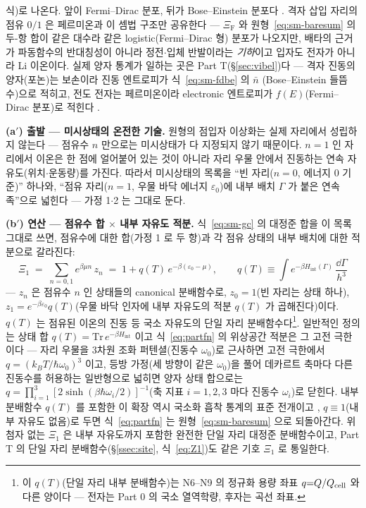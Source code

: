 \begin{bgbox}
식)로 나온다. 앞이 Fermi--Dirac 분포, 뒤가 Bose--Einstein 분포다 \cite{mcquarrie1976}. 격자 삽입 자리의
점유 $0/1$ 은 페르미온과 이 셈법 구조만 공유한다 --- $\Xi_\mathrm F$ 와 원형~\eqref{eq:sm-baresum} 의 두-항
합이 같은 대수라 같은 logistic(Fermi--Dirac 형) 분포가 나오지만, 배타의 근거가 파동함수의 반대칭성이 아니라
정전$\cdot$입체 반발이라는 \emph{기하}이고 입자도 전자가 아니라 Li 이온이다. 실제 양자 통계가 일하는 곳은
Part T(\S\ref{sec:vibel})다 --- 격자 진동의 양자(포논)는 보손이라 진동 엔트로피가 식~\eqref{eq:sm-fdbe} 의 $\bar n$
(Bose--Einstein 들뜸수)으로 적히고, 전도 전자는 페르미온이라 electronic 엔트로피가 $f(E)$(Fermi--Dirac
분포)로 적힌다 \cite{mcquarrie1976,ashcroftmermin1976}.
\end{bgbox}

\textbf{(a$'$) 출발 --- 미시상태의 온전한 기술.} 원형의 점입자 이상화는 실제 자리에서 성립하지 않는다 ---
점유수 $n$ 만으로는 미시상태가 다 지정되지 않기 때문이다. $n=1$ 인 자리에서 이온은 한 점에 얼어붙어
있는 것이 아니라 자리 우물 안에서 진동하는 연속 자유도(위치$\cdot$운동량)를 가진다. 따라서 미시상태의
목록을 ``빈 자리($n=0$, 에너지 $0$ 기준)'' 하나와, ``점유 자리($n=1$, 우물 바닥 에너지
$\varepsilon_0$)에 내부 배치 $\Gamma$ 가 붙은 연속족''으로 넓힌다 --- 가정 1$\cdot$2 는 그대로 둔다.

\textbf{(b$'$) 연산 --- 점유수 합 $\times$ 내부 자유도 적분.} 식~\eqref{eq:sm-gc} 의 대정준 합을 이 목록
그대로 쓰면, 점유수에 대한 합(가정 1 로 두 항)과 각 점유 상태의 내부 배치에 대한 적분으로 갈라진다:
\begin{equation}
\Xi_1\;=\;\sum_{n=0,1}e^{\beta\mu n}\,z_n
\;=\;1+q(T)\,e^{-\beta(\varepsilon_0-\mu)},
\qquad
q(T)\equiv\int e^{-\beta H_\mathrm{int}(\Gamma)}\,\frac{\dd\Gamma}{h^3}
\label{eq:partfn}
\end{equation}
--- $z_n$ 은 점유수 $n$ 인 상태들의 canonical 분배함수로, $z_0=1$(빈 자리는 상태 하나),
$z_1=e^{-\beta\varepsilon_0}q(T)$(우물 바닥 인자에 내부 자유도의 적분 $q(T)$ 가 곱해진다)이다.
$q(T)$ 는 점유된 이온의 진동 등 국소 자유도의 단일 자리 분배함수다\footnote{이 $q(T)$(단일 자리 내부 분배함수)는 N6--N9 의 정규화 용량 좌표 $q{=}Q/Q_{\mathrm{cell}}$ 와 다른 양이다 --- 전자는 Part 0 의 국소 열역학량, 후자는 곡선 좌표.}. 일반적인 정의는 상태
합 $q(T)=\mathrm{Tr}\,e^{-\beta H_\mathrm{int}}$ 이고 식~\eqref{eq:partfn} 의 위상공간 적분은 그 고전
극한이다 --- 자리 우물을 3차원 조화 퍼텐셜(진동수 $\omega_0$)로 근사하면 고전 극한에서
$q=(k_BT/\hbar\omega_0)^3$ 이고, 등방 가정(세 방향이 같은 $\omega_0$)을 풀어 데카르트 축마다 다른
진동수를 허용하는 일반형으로 넓히면 양자 상태 합으로는
$q=\prod_{i=1}^{3}[2\sinh(\beta\hbar\omega_i/2)]^{-1}$(축 지표 $i=1,2,3$ 마다 진동수 $\omega_i$)로 닫힌다.
내부 분배함수 $q(T)$ 를 포함한 이 확장 역시 국소화 흡착 통계의 표준 전개이고
\cite{hill1960,fowler1939,mcquarrie1976}, $q\equiv1$(내부 자유도 없음)로 두면
식~\eqref{eq:partfn} 는 원형~\eqref{eq:sm-baresum} 으로 되돌아간다. 위 첨자 없는 $\Xi_1$ 은 내부
자유도까지 포함한 완전한 단일 자리 대정준 분배함수이고, Part T 의 단일 자리 분배함수(\S\ref{ssec:site},
식~\eqref{eq:Z1})도 같은 기호 $\Xi_1$ 로 통일한다.

